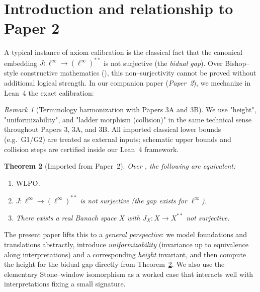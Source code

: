 \documentclass[11pt]{article}
\newtheorem{theorem}{Theorem}[section]
\theoremstyle{definition}
\theoremstyle{remark}
\newtheorem{remark}[theorem]{Remark}
\newcommand{\linf}{\ell^\infty}
\newcommand{\WLPO}{\mathrm{WLPO}}
\newcommand{\BISH}{\mathrm{BISH}}
\begin{document}
\section{Introduction and relationship to Paper 2}

A typical instance of axiom calibration is the classical fact that the canonical embedding $J:\linf\to(\linf)^{**}$ is not surjective (the \emph{bidual gap}). Over Bishop--style constructive mathematics (\BISH), this non--surjectivity cannot be proved without additional logical strength. In our companion paper (\emph{Paper~2}), we mechanize in Lean~4 the exact calibration:

\begin{remark}[Terminology harmonization with Papers 3A and 3B]
We use "height", "uniformizability", and "ladder morphism (collision)" in the same technical sense throughout Papers 3, 3A, and 3B.
All imported classical lower bounds (e.g.\ G1/G2) are treated as external inputs; schematic upper bounds
and collision steps are certified inside our Lean~4 framework.
\end{remark}

\begin{theorem}[Imported from Paper~2]\label{thm:paper2}
Over \BISH, the following are equivalent:
\begin{enumerate}
\item $\WLPO$.
\item $J:\linf\to(\linf)^{**}$ is not surjective (the gap exists for $\linf$).
\item There exists a real Banach space $X$ with $J_X:X\to X^{**}$ not surjective.
\end{enumerate}
\end{theorem}

The present paper lifts this to a \emph{general perspective}: we model foundations and translations abstractly, introduce \emph{uniformizability} (invariance up to equivalence along interpretations) and a corresponding \emph{height} invariant, and then compute the height for the bidual gap directly from Theorem~\ref{thm:paper2}. We also use the elementary Stone--window isomorphism as a worked case that interacts well with interpretations fixing a small signature.
\end{document}
